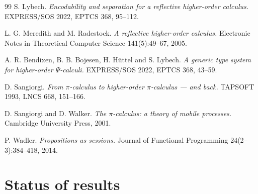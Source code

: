 \documentclass[11pt]{article}
\theoremstyle{definition}
\theoremstyle{plain}
\theoremstyle{remark}
\begin{document}
\begin{thebibliography}{99}
 S. Lybech.
\emph{Encodability and separation for a reflective higher-order calculus.}
EXPRESS/SOS 2022, EPTCS 368, 95--112.

 L. G. Meredith and M. Radestock.
\emph{A reflective higher-order calculus.}
Electronic Notes in Theoretical Computer Science 141(5):49--67, 2005.

 A. R. Bendixen, B. B. Bojesen, H. H\"uttel and S. Lybech.
\emph{A generic type system for higher-order $\Psi$-calculi.}
EXPRESS/SOS 2022, EPTCS 368, 43--59.

 D. Sangiorgi.
\emph{From $\pi$-calculus to higher-order $\pi$-calculus --- and back.}
TAPSOFT 1993, LNCS 668, 151--166.

 D. Sangiorgi and D. Walker.
\emph{The $\pi$-calculus: a theory of mobile processes.}
Cambridge University Press, 2001.

 P. Wadler.
\emph{Propositions as sessions.}
Journal of Functional Programming 24(2--3):384--418, 2014.

\end{thebibliography}

\appendix

\section{Status of results}\label{app:status}
\end{document}
